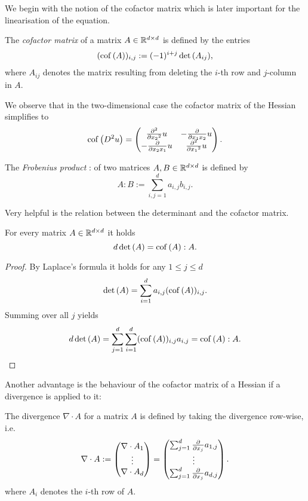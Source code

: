 We begin with the notion of the cofactor matrix which is later important for the linearisation of the \MA equation.
\begin{definition} \label{def: cof matrix}
	The \emph{cofactor matrix} of a matrix $A \in \mathbb{R}^{d \times d}$ is defined by the entries
	\begin{align}
	(\operatorname{cof} \left( A \right) )_{i,j} := (-1)^{i+j} \det{\left(A_{ij}\right)},
	\end{align}
	where $A_{ij}$ denotes the matrix resulting from deleting the $i$-th row and $j$-column in $A$.
\end{definition}

We observe that in the two-dimensional case the cofactor matrix of the Hessian simplifies to
\begin{align}
\operatorname{cof} \left( D^2 u \right) = \begin{pmatrix}
								\frac {\partial^2} {\partial {x_2}^2} u & -\frac {\partial }{\partial x_1 x_2} u\\
								-\frac {\partial }{\partial x_2 x_1} u & \frac {\partial^2} {\partial {x_1}^2} u
							\end{pmatrix}.
\end{align}

\begin{definition} \label{def: frobenius product}
	The \emph{Frobenius product} : of two matrices $A, B \in \mathbb{R}^{d \times d}$ is defined by
	\[
		A:B := \sum_{i,j=1} ^d a_{i,j} b_{i,j}.
	\]
\end{definition}

Very helpful is the relation between the determinant and the cofactor matrix.
\begin{lemma}\label{la: rel det cofactor}
	For every matrix $A  \in \mathbb{R}^{d \times d}$ it holds
	\[
		d \det{\left(A\right)} = \operatorname{cof} \left( A \right): A.
	\]
\end{lemma}
\begin{proof}
	By Laplace's formula it holds for any $1 \leq j \leq d$
	\[
		\det{\left(A\right)} = \sum\limits_{i = 1}^{d} a_{i,j} (\operatorname{cof} \left( A \right) )_{i,j}.
	\]
	Summing over all $j$ yields
	\[
		d \det{\left(A\right)} = \sum\limits_{j= 1}^{d} \sum\limits_{i = 1}^{d} (\operatorname{cof} \left( A \right) )_{i,j}  a_{i,j}  = \operatorname{cof} \left( A \right): A.
	\]
	\phantom{blub}
\end{proof}

Another advantage is the behaviour of the cofactor matrix of a Hessian if a divergence is applied to it:
\begin{definition}
The divergence $\nabla \cdot A$ for a matrix $A$ is defined by taking the divergence row-wise, i.e.
\[
	\nabla \cdot A := \begin{pmatrix} \nabla \cdot A_1 \\ \vdots \\ \nabla \cdot A_d\end{pmatrix}
	= \begin{pmatrix} \sum_{j = 1}^{d} \frac \partial {\partial x_j} a_{1,j} \\ \vdots \\ \sum_{j = 1}^{d} \frac \partial {\partial x_j} a_{d,j}\end{pmatrix}.
\]
where $A_i$ denotes the $i$-th row of $A$.
	
\end{definition}

